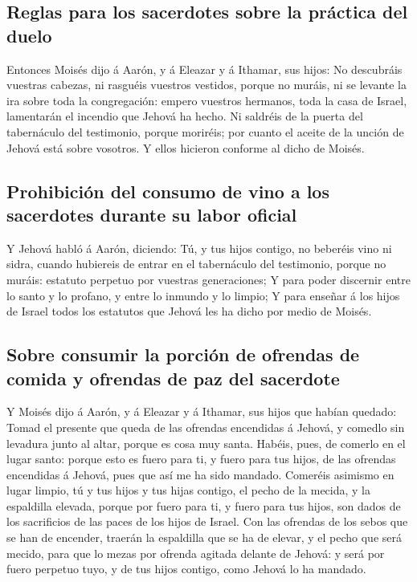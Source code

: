 \hypertarget{reglas-para-los-sacerdotes-sobre-la-pruxe1ctica-del-duelo}{%
\subsection{Reglas para los sacerdotes sobre la práctica del
duelo}\label{reglas-para-los-sacerdotes-sobre-la-pruxe1ctica-del-duelo}}

 Entonces Moisés dijo á Aarón, y á Eleazar y á Ithamar, sus
hijos: No descubráis vuestras cabezas, ni rasguéis vuestros vestidos,
porque no muráis, ni se levante la ira sobre toda la congregación:
empero vuestros hermanos, toda la casa de Israel, lamentarán el incendio
que Jehová ha hecho.  Ni saldréis de la puerta del
tabernáculo del testimonio, porque moriréis; por cuanto el aceite de la
unción de Jehová está sobre vosotros. Y ellos hicieron conforme al dicho
de Moisés.

\hypertarget{prohibiciuxf3n-del-consumo-de-vino-a-los-sacerdotes-durante-su-labor-oficial}{%
\subsection{Prohibición del consumo de vino a los sacerdotes durante su
labor
oficial}\label{prohibiciuxf3n-del-consumo-de-vino-a-los-sacerdotes-durante-su-labor-oficial}}

 Y Jehová habló á Aarón, diciendo:  Tú, y tus
hijos contigo, no beberéis vino ni sidra, cuando hubiereis de entrar en
el tabernáculo del testimonio, porque no muráis: estatuto perpetuo por
vuestras generaciones;  Y para poder discernir entre lo
santo y lo profano, y entre lo inmundo y lo limpio;  Y para
enseñar á los hijos de Israel todos los estatutos que Jehová les ha
dicho por medio de Moisés.

\hypertarget{sobre-consumir-la-porciuxf3n-de-ofrendas-de-comida-y-ofrendas-de-paz-del-sacerdote}{%
\subsection{Sobre consumir la porción de ofrendas de comida y ofrendas
de paz del
sacerdote}\label{sobre-consumir-la-porciuxf3n-de-ofrendas-de-comida-y-ofrendas-de-paz-del-sacerdote}}

 Y Moisés dijo á Aarón, y á Eleazar y á Ithamar, sus hijos
que habían quedado: Tomad el presente que queda de las ofrendas
encendidas á Jehová, y comedlo sin levadura junto al altar, porque es
cosa muy santa.  Habéis, pues, de comerlo en el lugar
santo: porque esto es fuero para ti, y fuero para tus hijos, de las
ofrendas encendidas á Jehová, pues que así me ha sido mandado.
 Comeréis asimismo en lugar limpio, tú y tus hijos y tus
hijas contigo, el pecho de la mecida, y la espaldilla elevada, porque
por fuero para ti, y fuero para tus hijos, son dados de los sacrificios
de las paces de los hijos de Israel.  Con las ofrendas de
los sebos que se han de encender, traerán la espaldilla que se ha de
elevar, y el pecho que será mecido, para que lo mezas por ofrenda
agitada delante de Jehová: y será por fuero perpetuo tuyo, y de tus
hijos contigo, como Jehová lo ha mandado.

